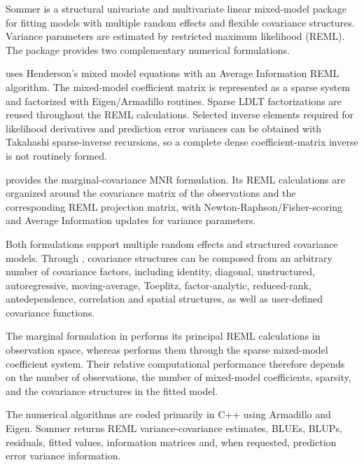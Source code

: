 \documentclass[a4paper]{book}
\begin{document}
\begin{Description}\relax

Sommer is a structural univariate and multivariate linear mixed-model package
for fitting models with multiple random effects and flexible covariance
structures. Variance parameters are estimated by restricted maximum likelihood
(REML). The package provides two complementary numerical formulations.

 uses Henderson's mixed model equations with an Average
Information REML algorithm. The mixed-model coefficient matrix is represented
as a sparse system and factorized with Eigen/Armadillo routines. Sparse LDLT
factorizations are reused throughout the REML calculations. Selected inverse
elements required for likelihood derivatives and prediction error variances can
be obtained with Takahashi sparse-inverse recursions, so a complete dense
coefficient-matrix inverse is not routinely formed.

 provides the marginal-covariance MNR formulation. Its REML
calculations are organized around the covariance matrix of the observations and
the corresponding REML projection matrix, with Newton-Raphson/Fisher-scoring
and Average Information updates for variance parameters.

Both formulations support multiple random effects and structured covariance
models. Through , covariance structures can be composed from
an arbitrary number of covariance factors, including identity, diagonal,
unstructured, autoregressive, moving-average, Toeplitz, factor-analytic,
reduced-rank, antedependence, correlation and spatial structures, as well as
user-defined covariance functions.

The marginal formulation in  performs its principal REML
calculations in observation space, whereas  performs them through
the sparse mixed-model coefficient system. Their relative computational
performance therefore depends on the number of observations, the number of
mixed-model coefficients, sparsity, and the covariance structures in the
fitted model.

The numerical algorithms are coded primarily in C++ using Armadillo and Eigen.
Sommer returns REML variance-covariance estimates, BLUEs, BLUPs, residuals,
fitted values, information matrices and, when requested, prediction error
variance information.

\end{Description}
%
\end{document}
